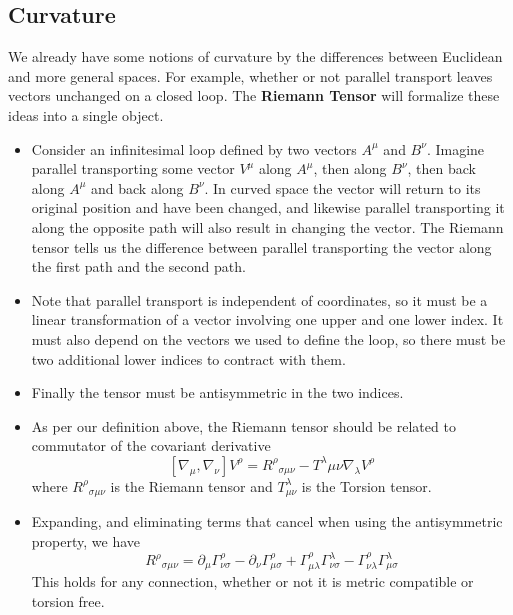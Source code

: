 \documentclass[11pt]{article}
\begin{document}
\subsection{Curvature}\label{Riemann}
We already have some notions of curvature by the differences between Euclidean and more general spaces. For example, whether or not parallel transport leaves vectors unchanged on a closed loop. The \textbf{Riemann Tensor} will 
formalize these ideas into a single object. 
\begin{itemize}
    \item Consider an infinitesimal loop defined by two vectors \(A^\mu\) and \(B^\nu\). Imagine parallel transporting some vector \(V^\mu\) along \(A^\mu\), then along \(B^\nu\), then back along \(A^\mu\) and back along \(B^\nu\).
    In curved space the vector will return to its original position and have been changed, and likewise parallel transporting it along the opposite path will also result in changing the vector. The Riemann tensor tells us the difference
    between parallel transporting the vector along the first path and the second path. 

    \item Note that parallel transport is independent of coordinates, so it must be a linear transformation of a vector involving one upper and one lower index. It must also depend on the vectors we used to define the loop, so there must 
    be two additional lower indices to contract with them.

    \item Finally the tensor must be antisymmetric in the two indices.

    \item As per our definition above, the Riemann tensor should be related to commutator of the covariant derivative 
    \[
        [\nabla_\mu , \nabla_\nu]V^\rho = R^\rho{}_{\sigma \mu \nu} - T^\lambda{\mu \nu} \nabla_\lambda V^\rho
    \]
    where \(R^{\rho}{}_{\sigma \mu \nu}\) is the Riemann tensor and \(T^\lambda_{\mu \nu}\) is the Torsion tensor.

    \item Expanding, and eliminating terms that cancel when using the antisymmetric property, we have
    \[
        R^\rho{}_{\sigma \mu \nu} = \partial_\mu \Gamma^\rho_{\nu \sigma} - \partial_\nu \Gamma^\rho_{\mu\sigma} + \Gamma^\rho_{\mu \lambda}\Gamma^\lambda_{\nu \sigma} - \Gamma^\rho_{\nu \lambda}\Gamma^\lambda_{\mu \sigma}
    \]
    This holds for any connection, whether or not it is metric compatible or torsion free.


\end{itemize}
\end{document}
